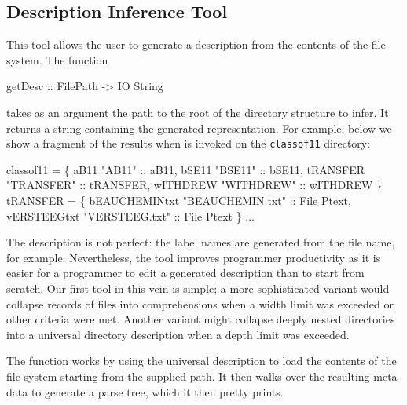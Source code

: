 \subsection{Description Inference Tool}
This tool allows the user to generate a \forest{} description from the
contents of the file system.   The function
\begin{code}
getDesc :: FilePath -> IO String
\end{code}
takes as an argument the path to the root of the directory structure
to infer.  It returns a string containing the generated
representation.  For example, below we show a fragment of the
results when
 is invoked on the \texttt{classof11} directory:
\begin{code}
 classof11 =  \{
    aB11  "AB11" :: aB11,
    bSE11  "BSE11" :: bSE11,
    tRANSFER  "TRANSFER" :: tRANSFER,
    wITHDREW  "WITHDREW" :: wITHDREW
\}
 tRANSFER =  \{
    bEAUCHEMINtxt  "BEAUCHEMIN.txt" :: File Ptext,
    vERSTEEGtxt  "VERSTEEG.txt" :: File Ptext
\}
...
\end{code}
The description is not perfect: the label names are generated 
from the file name, for example.  Nevertheless, the tool improves
programmer productivity as it is
easier for a programmer to edit a generated description than to
start from scratch.   Our first tool in this vein is simple;
a more sophisticated variant would collapse records of files
into comprehensions when a width limit was exceeded or
other criteria were met.  Another variant might
collapse deeply nested directories into a universal directory
description when a depth limit was exceeded.

The  function works by using the universal description to
load the contents of the file system starting from the supplied path.
It then walks over the resulting meta-data to generate a \forest{}
parse tree, which it then pretty prints.




